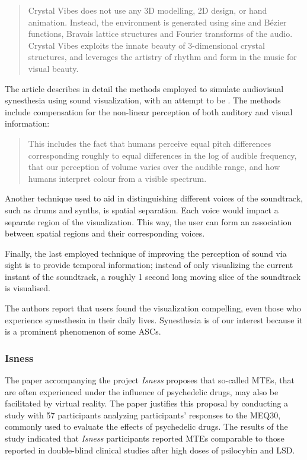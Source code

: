 \begin{quote}
    Crystal Vibes does not use any 3D modelling, 2D design, or hand animation. Instead, the environment is generated using sine and Bézier functions, Bravais lattice structures and Fourier transforms of the audio. Crystal Vibes exploits the innate beauty of 3-dimensional crystal structures, and leverages the artistry of rhythm and form in the music for visual beauty.
\end{quote}

The article describes in detail the methods employed to simulate audiovisual synesthesia using sound visualization, with an attempt to be . The methods include compensation for the non-linear perception of both auditory and visual information:

\begin{quote}
    This includes the fact that humans perceive equal pitch differences corresponding roughly to equal differences in the log of audible frequency, that our perception of volume varies over the audible range, and how humans interpret colour from a visible spectrum.
\end{quote}

Another technique used to aid in distinguishing different voices of the soundtrack, such as drums and synths, is spatial separation. Each voice would impact a separate region of the visualization. This way, the user can form an association between spatial regions and their corresponding voices.

Finally, the last employed technique of improving the perception of sound via sight is to provide temporal information; instead of only visualizing the current instant of the soundtrack, a roughly 1 second long moving slice of the soundtrack is visualised.

The authors report that users found the visualization compelling, even those who experience synesthesia in their daily lives. Synesthesia is of our interest because it is a prominent phenomenon of some \acp{ASC}.

\subsubsection{Isness}
The paper \autocite{glowacki2020isness} accompanying the project \textit{Isness} proposes that so-called \acp{MTE}, that are often experienced under the influence of psychedelic drugs, may also be facilitated by virtual reality. The paper justifies this proposal by conducting a study with 57 participants analyzing participants' responses to the \ac{MEQ30}, commonly used to evaluate the effects of psychedelic drugs. The results of the study indicated that \textit{Isness} participants reported \acp{MTE} comparable to those reported in double-blind clinical studies after high doses of psilocybin and LSD.

